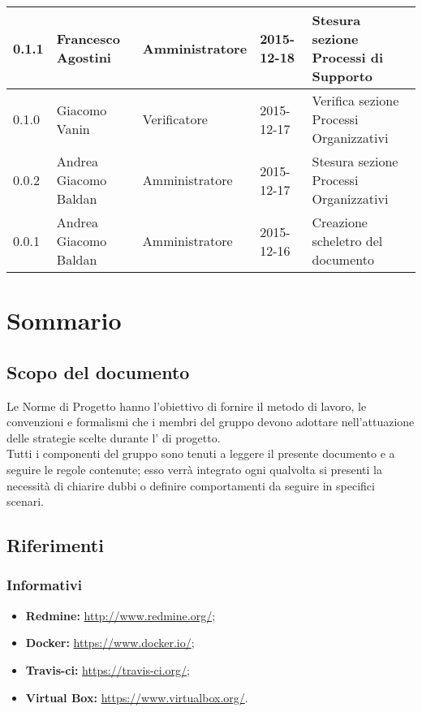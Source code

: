 \documentclass{scalatekids-article}
\begin{document}
\begin{center}
\begin{longtable}{| l | l | l | l | p{5cm} |}
    \hline
    0.1.1 & Francesco Agostini & Amministratore & 2015-12-18 & Stesura sezione Processi di Supporto\\
    \hline
    0.1.0 & Giacomo Vanin & Verificatore & 2015-12-17 & Verifica sezione Processi Organizzativi\\
    \hline
    0.0.2 & Andrea Giacomo Baldan & Amministratore & 2015-12-17 & Stesura sezione Processi Organizzativi\\
    \hline
    0.0.1 & Andrea Giacomo Baldan & Amministratore & 2015-12-16 & Creazione scheletro del documento\\
    \hline
  \end{longtable}
\end{center}
\tableofcontents
\newpage
{}

\section{Sommario}

\subsection{Scopo del documento}

Le Norme di Progetto hanno l'obiettivo di fornire il metodo di lavoro, le
convenzioni e formalismi che i membri del gruppo devono adottare nell'attuazione
delle strategie scelte durante l' di progetto. \\
Tutti i componenti del gruppo sono tenuti a leggere il presente documento e a seguire
le regole contenute; esso verrà integrato ogni qualvolta si presenti la necessità di
chiarire dubbi o definire comportamenti da seguire in specifici scenari.

\prodPurpose{}
\glossExpl{}

\subsection{Riferimenti}

\subsubsection{Informativi}

\begin{itemize}
\item\textbf{Redmine:} \url{http://www.redmine.org/};
\item\textbf{Docker:} \url{https://www.docker.io/};
\item\textbf{Travis-ci:} \url{https://travis-ci.org/};
\item\textbf{Virtual Box:} \url{https://www.virtualbox.org/}.
\end{itemize}
\end{document}
